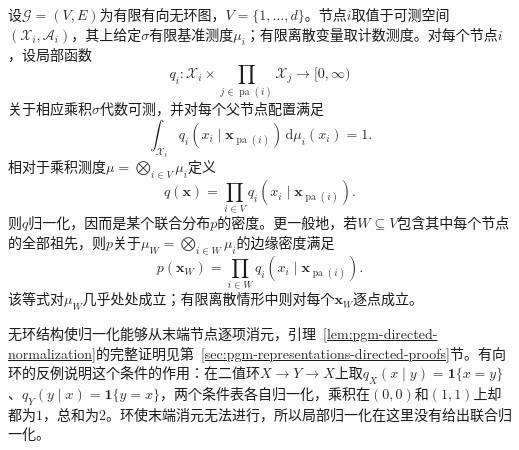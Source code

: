\begin{lemma}[局部归一化与祖先边缘化]
  \label{lem:pgm-directed-normalization}
  设$\mathcal{G}=(V,E)$为有限有向无环图，$V=\{1,\ldots,d\}$。节点$i$取值于可测空间$(\mathcal{X}_i,\mathcal{A}_i)$，其上给定$\sigma$有限基准测度$\mu_i$；有限离散变量取计数测度。对每个节点$i$，设局部函数
  \[
    q_i:
    \mathcal{X}_i\times
    \prod_{j\in\operatorname{pa}(i)}\mathcal{X}_j
    \longrightarrow[0,\infty)
  \]
  关于相应乘积$\sigma$代数可测，并对每个父节点配置满足
  \[
    \int_{\mathcal{X}_i}
    q_i(x_i\mid\bm{x}_{\operatorname{pa}(i)})\,\mathrm{d}\mu_i(x_i)=1.
  \]
  相对于乘积测度$\mu=\bigotimes_{i\in V}\mu_i$定义
  \[
    q(\bm{x})=\prod_{i\in V}
    q_i(x_i\mid\bm{x}_{\operatorname{pa}(i)}).
  \]
  则$q$归一化，因而是某个联合分布$p$的密度。更一般地，若$W\subseteq V$包含其中每个节点的全部祖先，则$p$关于$\mu_W=\bigotimes_{i\in W}\mu_i$的边缘密度满足
  \begin{equation}
    p(\bm{x}_W)=
    \prod_{i\in W}q_i(x_i\mid\bm{x}_{\operatorname{pa}(i)}).
    \label{eq:pgm-directed-ancestral-marginal}
  \end{equation}
  该等式对$\mu_W$几乎处处成立；有限离散情形中则对每个$\bm{x}_W$逐点成立。
\end{lemma}

无环结构使归一化能够从末端节点逐项消元，引理~\ref{lem:pgm-directed-normalization}的完整证明见第~\ref{sec:pgm-representations-directed-proofs}节。有向环的反例说明这个条件的作用：在二值环$X\to Y\to X$上取$q_X(x\mid y)=\mathbf{1}\{x=y\}$、$q_Y(y\mid x)=\mathbf{1}\{y=x\}$，两个条件表各自归一化，乘积在$(0,0)$和$(1,1)$上却都为$1$，总和为$2$。环使末端消元无法进行，所以局部归一化在这里没有给出联合归一化。

